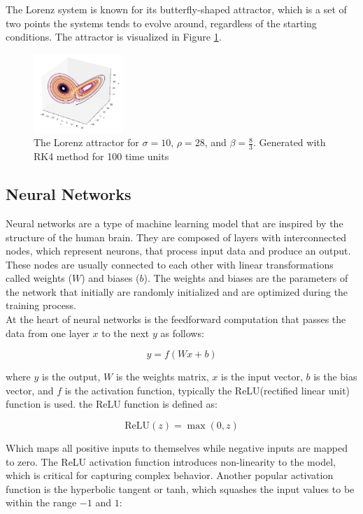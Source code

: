 \documentclass[11pt]{article}
\begin{document}
The Lorenz system is known for its butterfly-shaped attractor, which is a set of two points the systems tends to evolve around, regardless of the starting conditions. The attractor is visualized in Figure \ref{fig:lorenz_attractor}.

\begin{figure}[h]
\centering
\includegraphics[width=0.3\textwidth]{lorenz_attractor.jpeg}
\caption{The Lorenz attractor for $\sigma = 10$, $\rho = 28$, and $\beta = \frac{8}{3}$. Generated with RK4 method for 100 time units}
\label{fig:lorenz_attractor}
\end{figure}

\subsection{Neural Networks}

Neural networks are a type of machine learning model that are inspired by the structure of the human brain. They are composed of layers with interconnected nodes, which represent neurons, that process input data and produce an output. These nodes are usually connected to each other with linear transformations called weights (\(W\)) and biases (\(b\)). The weights and biases are the parameters of the network that initially are randomly initialized and are optimized during the training process. \\

At the heart of neural networks is the feedforward computation that passes the data from one layer \(x\) to the next \(y\) as follows:

\[ y = f(Wx + b) \]

where \(y\) is the output, \(W\) is the weights matrix, \(x\) is the input vector, \(b\) is the bias vector, and \(f\) is the activation function, typically the ReLU(rectified linear unit) function is used. the ReLU function is defined as:

\[ \text{ReLU}(z) = \max(0, z) \]

Which maps all positive inputs to themselves while negative inputs are mapped to zero. The ReLU activation function introduces non-linearity to the model, which is critical for capturing complex behavior. Another popular activation function is the hyperbolic tangent or tanh, which squashes the input values to be within the range \(-1\) and \(1\):
\end{document}
